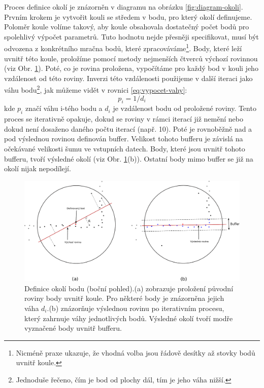 \documentclass[11pt,twoside,a4paper]{book}
\begin{document}
Proces definice okolí je znázorněn v diagramu na obrázku \ref{fig:diagram-okoli}. Prvním krokem je vytvořit kouli se středem v bodu, pro který okolí definujeme. Poloměr koule volíme takový, aby koule obsahovala dostatečný počet bodů pro spolehlivý výpočet parametrů. Tuto hodnotu nejde přesněji specifikovat, musí být odvozena z konkrétního mračna bodů, které zpracováváme\footnote{Nicméně praxe ukazuje, že vhodná volba jsou řádově desítky až stovky bodů uvnitř koule.}. Body, které leží uvnitř této koule, proložíme pomocí metody nejmenších čtverců výchozí rovinnou (viz Obr. \ref{fig:definice-okoli}). Poté, co je rovina proložena, vypočítáme pro každý bod v kouli jeho vzdálenost od této roviny. Inverzi této vzdálenosti použijeme v další iteraci jako váhu bodu\footnote{Jednoduše řečeno, čím je bod od plochy dál, tím je jeho váha nižší.}, jak můžeme vidět v rovnici \ref{eq:vypocet-vahy}:
\begin{equation}
p_i = 1/d_i
\label{eq:vypocet-vahy}
\end{equation}
kde $p_i$ značí váhu i-tého bodu a  $d_i$ je vzdálenost bodu od proložené roviny. Tento proces  se iterativně opakuje, dokud se roviny v rámci iterací již nemění nebo dokud není dosaženo daného počtu iterací (např. 10). Poté je rovnoběžně nad a pod výslednou rovinou definován buffer. Velikost tohoto bufferu je závislá na očekávané velikosti šumu ve vstupních datech. Body, které jsou uvnitř tohoto bufferu, tvoří výsledné okolí (viz Obr. \ref{fig:definice-okoli}(b)). Ostatní body mimo buffer se již na okolí nijak nepodílejí.

\begin{figure}[ht]
\begin{center}
\includegraphics[width=\textwidth]{figures/2-2-definice-okoli}
\caption{Definice okolí bodu (boční pohled).\newline (a) zobrazuje proložení původní roviny body uvnitř koule. Pro některé body je znázorněna jejich váha $d_i$.\newline (b) znázorňuje výslednou rovinu po iterativním procesu, který zahrnuje váhy jednotlivých bodů. Výsledné okolí tvoří modře vyznačené body uvnitř bufferu.}
\label{fig:definice-okoli}
\end{center}
\end{figure}
\end{document}
